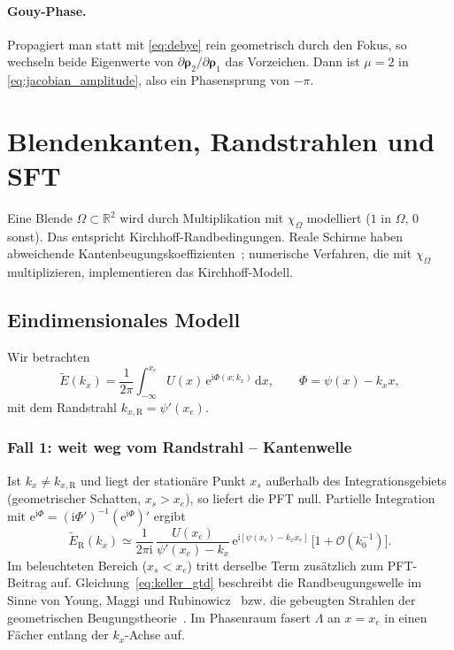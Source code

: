 \documentclass[11pt,a4paper]{scrartcl}
\theoremstyle{insightstyle}
\newcommand{\dd}{\mathrm{d}}
\newcommand{\ii}{\mathrm{i}}
\newcommand{\ee}{\mathrm{e}}
\newcommand{\R}{\mathbb{R}}
\newcommand{\rh}{\bm{\rho}}
\begin{document}
\paragraph{Gouy-Phase.} Propagiert man statt mit \eqref{eq:debye} rein geometrisch durch den Fokus, so wechseln beide Eigenwerte von $\partial\rh_2/\partial\rh_1$ das Vorzeichen. Dann ist $\mu=2$ in \eqref{eq:jacobian_amplitude}, also ein Phasensprung von $-\pi$.

\section{Blendenkanten, Randstrahlen und SFT}\label{sec:edges}

Eine Blende $\Omega\subset\R^2$ wird durch Multiplikation mit $\chi_\Omega$ modelliert ($1$ in $\Omega$, $0$ sonst). Das entspricht Kirchhoff-Randbedingungen. Reale Schirme haben abweichende Kantenbeugungskoeffizienten~\cite{keller1962}; numerische Verfahren, die mit $\chi_\Omega$ multiplizieren, implementieren das Kirchhoff-Modell.

\subsection{Eindimensionales Modell}
Wir betrachten
\begin{equation}
    \tilde E(k_x) = \frac{1}{2\pi}\int_{-\infty}^{x_e}U(x)\,\ee^{\ii\Phi(x;k_x)}\,\dd x,\qquad \Phi=\psi(x)-k_xx,
    \label{eq:edge_integral}
\end{equation}
mit dem Randstrahl $k_{x,\text{R}}=\psi'(x_e)$.

\subsubsection{Fall 1: weit weg vom Randstrahl -- Kantenwelle}
Ist $k_x\neq k_{x,\text{R}}$ und liegt der stationäre Punkt $x_s$ außerhalb des Integrationsgebiets (geometrischer Schatten, $x_s>x_e$), so liefert die PFT null. Partielle Integration mit $\ee^{\ii\Phi}=(\ii\Phi')^{-1}(\ee^{\ii\Phi})'$ ergibt
\begin{equation}
    \tilde E_\text{R}(k_x) \simeq \frac{1}{2\pi\ii}\,\frac{U(x_e)}{\psi'(x_e)-k_x}\,\ee^{\ii[\psi(x_e)-k_xx_e]}\,\big[1+\mathcal O(k_0^{-1})\big].
    \label{eq:keller_gtd}
\end{equation}
Im beleuchteten Bereich ($x_s<x_e$) tritt derselbe Term zusätzlich zum PFT-Beitrag auf. Gleichung~\eqref{eq:keller_gtd} beschreibt die Randbeugungswelle im Sinne von Young, Maggi und Rubinowicz~\cite{rubinowicz1917,miyamoto1962a} bzw. die gebeugten Strahlen der geometrischen Beugungstheorie~\cite{keller1962}. Im Phasenraum fasert $\Lambda$ an $x=x_e$ in einen Fächer entlang der $k_x$-Achse auf.
\end{document}
